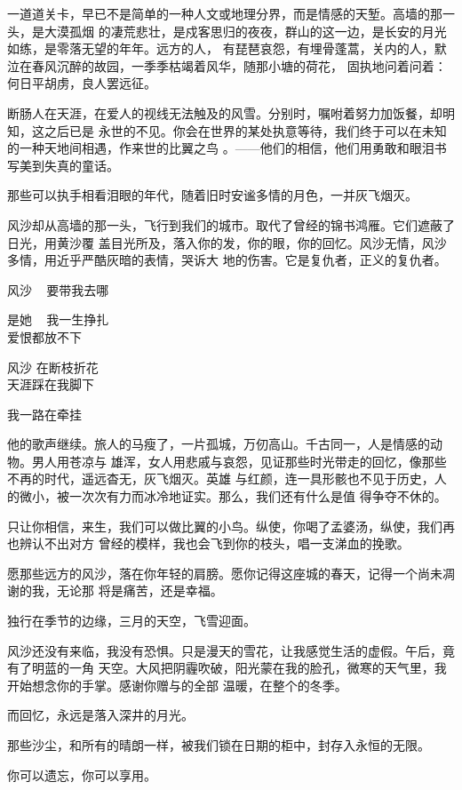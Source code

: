 \documentclass[12pt,a4paper]{article}
\begin{document}
		一道道关卡，早已不是简单的一种人文或地理分界，而是情感的天堑。高墙的那一头，是大漠孤烟
	的凄荒悲壮，是戍客思归的夜夜，群山的这一边，是长安的月光如练，是零落无望的年年。远方的人，
	有琵琶哀怨，有埋骨蓬蒿，关内的人，默泣在春风沉醉的故园，一季季枯竭着风华，随那小塘的荷花，
	固执地问着问着：何日平胡虏，良人罢远征。

		断肠人在天涯，在爱人的视线无法触及的风雪。分别时，嘱咐着努力加饭餐，却明知，这之后已是
	永世的不见。你会在世界的某处执意等待，我们终于可以在未知的一种天地间相遇，作来世的比翼之鸟
	。——他们的相信，他们用勇敢和眼泪书写美到失真的童话。

		那些可以执手相看泪眼的年代，随着旧时安谧多情的月色，一并灰飞烟灭。

		风沙却从高墙的那一头，飞行到我们的城市。取代了曾经的锦书鸿雁。它们遮蔽了日光，用黄沙覆
	盖目光所及，落入你的发，你的眼，你的回忆。风沙无情，风沙多情，用近乎严酷灰暗的表情，哭诉大
	地的伤害。它是复仇者，正义的复仇者。

		\longpoem{}{}{}
		风沙 ~ 要带我去哪

		是她 ~ 我一生挣扎 \\
		爱恨都放不下

		风沙 在断枝折花 \\
		天涯踩在我脚下

		我一路在牵挂
		\endlongpoem

		他的歌声继续。旅人的马瘦了，一片孤城，万仞高山。千古同一，人是情感的动物。男人用苍凉与
	雄浑，女人用悲戚与哀怨，见证那些时光带走的回忆，像那些不再的时代，遥远杳无，灰飞烟灭。英雄
	与红颜，连一具形骸也不见于历史，人的微小，被一次次有力而冰冷地证实。那么，我们还有什么是值
	得争夺不休的。

		只让你相信，来生，我们可以做比翼的小鸟。纵使，你喝了孟婆汤，纵使，我们再也辨认不出对方
	曾经的模样，我也会飞到你的枝头，唱一支涕血的挽歌。

		愿那些远方的风沙，落在你年轻的肩膀。愿你记得这座城的春天，记得一个尚未凋谢的我，无论那
	将是痛苦，还是幸福。

		独行在季节的边缘，三月的天空，飞雪迎面。

		风沙还没有来临，我没有恐惧。只是漫天的雪花，让我感觉生活的虚假。午后，竟有了明蓝的一角
	天空。大风把阴霾吹破，阳光蒙在我的脸孔，微寒的天气里，我开始想念你的手掌。感谢你赠与的全部
	温暖，在整个的冬季。

		而回忆，永远是落入深井的月光。

		那些沙尘，和所有的晴朗一样，被我们锁在日期的柜中，封存入永恒的无限。

		你可以遗忘，你可以享用。
\end{document}

